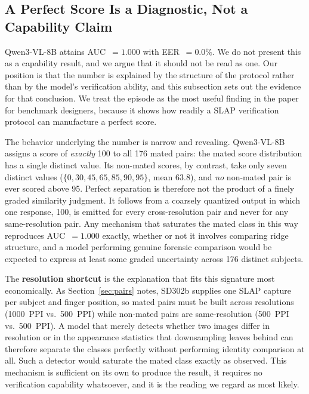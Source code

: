 \documentclass[journal]{IEEEtran}
\begin{document}
\subsection{A Perfect Score Is a Diagnostic, Not a Capability Claim}
\label{sec:perfect}

Qwen3-VL-8B attains AUC~$= 1.000$ with EER~$= 0.0\%$. We do not present
this as a capability result, and we argue that it should not be read as
one. Our position is that the number is explained by the structure of the
protocol rather than by the model's verification ability, and this
subsection sets out the evidence for that conclusion. We treat the episode
as the most useful finding in the paper for benchmark designers, because it
shows how readily a SLAP verification protocol can manufacture a perfect
score.

The behavior underlying the number is narrow and revealing. Qwen3-VL-8B
assigns a score of \emph{exactly} 100 to all 176 mated pairs: the mated
score distribution has a single distinct value. Its non-mated scores, by
contrast, take only seven distinct values
($\{0, 30, 45, 65, 85, 90, 95\}$, mean 63.8), and \emph{no} non-mated pair
is ever scored above 95. Perfect separation is therefore not the product of
a finely graded similarity judgment. It follows from a coarsely quantized
output in which one response, 100, is emitted for every cross-resolution
pair and never for any same-resolution pair. Any mechanism that saturates
the mated class in this way reproduces AUC~$= 1.000$ exactly, whether or not
it involves comparing ridge structure, and a model performing genuine
forensic comparison would be expected to express at least some graded
uncertainty across 176 distinct subjects.

The \textbf{resolution shortcut} is the explanation that fits this signature
most economically. As Section~\ref{sec:pairs} notes, SD302b supplies one
SLAP capture per subject and finger position, so mated pairs must be built
across resolutions (1000~PPI vs.\ 500~PPI) while non-mated pairs are
same-resolution (500~PPI vs.\ 500~PPI). A model that merely detects whether
two images differ in resolution or in the appearance statistics that
downsampling leaves behind can therefore separate the classes perfectly
without performing identity comparison at all. Such a detector would
saturate the mated class exactly as observed. This mechanism is sufficient
on its own to produce the result, it requires no verification capability
whatsoever, and it is the reading we regard as most likely.
\end{document}
